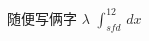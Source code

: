 \documentclass[a4paper,12pt]{report}
\begin{document}
随便写俩字
\nabla 
$\lambda$
$\int_{sfd}^{12}  \,dx $
\end{document}
